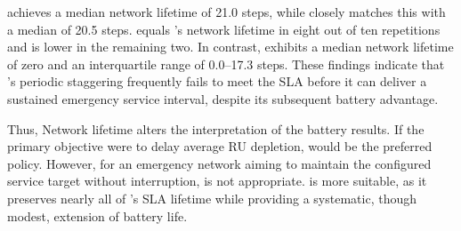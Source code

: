  achieves a median network lifetime of 21.0 steps, while  closely matches this with a median of 20.5 steps.   equals 's network lifetime in eight out of ten repetitions and is lower in the remaining two. In contrast,  exhibits a median network lifetime of zero and an interquartile range of 0.0--17.3 steps. These findings indicate that 's periodic staggering frequently fails to meet the SLA before it can deliver a sustained emergency service interval, despite its subsequent battery advantage.

Thus, Network lifetime alters the interpretation of the battery results. If the primary objective were to delay average RU depletion,  would be the preferred policy. However, for an emergency network aiming to maintain the configured service target without interruption,  is not appropriate.  is more suitable, as it preserves nearly all of 's SLA lifetime while providing a systematic, though modest, extension of battery life.